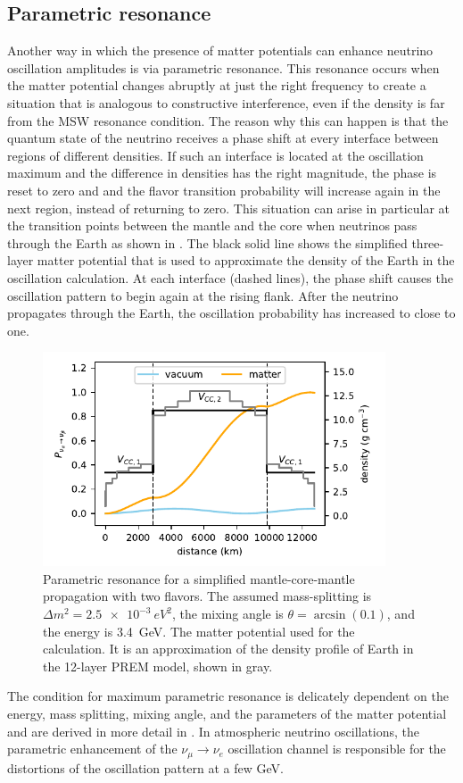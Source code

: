 \subsection{Parametric resonance}
\label{sec:parametric-resonance}
Another way in which the presence of matter potentials can enhance neutrino oscillation amplitudes is via parametric resonance.
This resonance occurs when the matter potential changes abruptly at just the right frequency to create a situation that is analogous to constructive interference, even if the density is far from the MSW resonance condition.
The reason why this can happen is that the quantum state of the neutrino receives a phase shift at every interface between regions of different densities.
If such an interface is located at the oscillation maximum and the difference in densities has the right magnitude, the phase is reset to zero and and the flavor transition probability will increase again in the next region, instead of returning to zero.
This situation can arise in particular at the transition points between the mantle and the core when neutrinos pass through the Earth as shown in .
The black solid line shows the simplified three-layer matter potential that is used to approximate the density of the Earth in the oscillation calculation.
At each interface (dashed lines), the phase shift causes the oscillation pattern to begin again at the rising flank.
After the neutrino propagates through the Earth, the oscillation probability has increased to close to one.
\begin{figure}
    \includegraphics[width=4in]{figures/theory/parametric_resonance.pdf}
    \caption{Parametric resonance for a simplified mantle-core-mantle propagation with two flavors. The assumed mass-splitting is $\Delta m^2=\SI{2.5e-3}{eV^2}$, the mixing angle is $\theta=\arcsin(0.1)$, and the energy is \SI{3.4}{GeV}. The matter potential used for the calculation. It is an approximation of the density profile of Earth in the 12-layer PREM model, shown in gray.\label{fig:parametric-resonance}}
\end{figure}
The condition for maximum parametric resonance is delicately dependent on the energy, mass splitting, mixing angle, and the parameters of the matter potential and are derived in more detail in \cite{Akhmedov:1999ty}.
In atmospheric neutrino oscillations, the parametric enhancement of the $\nu_\mu\rightarrow\nu_e$ oscillation channel is responsible for the distortions of the oscillation pattern at a few GeV.


